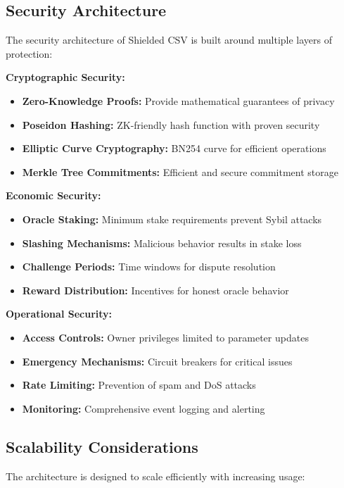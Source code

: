 \documentclass[11pt,a4paper]{article}
\begin{document}
\subsection{Security Architecture}

The security architecture of Shielded CSV is built around multiple layers of protection:

\textbf{Cryptographic Security:}
\begin{itemize}
    \item \textbf{Zero-Knowledge Proofs:} Provide mathematical guarantees of privacy
    \item \textbf{Poseidon Hashing:} ZK-friendly hash function with proven security
    \item \textbf{Elliptic Curve Cryptography:} BN254 curve for efficient operations
    \item \textbf{Merkle Tree Commitments:} Efficient and secure commitment storage
\end{itemize}

\textbf{Economic Security:}
\begin{itemize}
    \item \textbf{Oracle Staking:} Minimum stake requirements prevent Sybil attacks
    \item \textbf{Slashing Mechanisms:} Malicious behavior results in stake loss
    \item \textbf{Challenge Periods:} Time windows for dispute resolution
    \item \textbf{Reward Distribution:} Incentives for honest oracle behavior
\end{itemize}

\textbf{Operational Security:}
\begin{itemize}
    \item \textbf{Access Controls:} Owner privileges limited to parameter updates
    \item \textbf{Emergency Mechanisms:} Circuit breakers for critical issues
    \item \textbf{Rate Limiting:} Prevention of spam and DoS attacks
    \item \textbf{Monitoring:} Comprehensive event logging and alerting
\end{itemize}

\subsection{Scalability Considerations}

The architecture is designed to scale efficiently with increasing usage:
\end{document}
